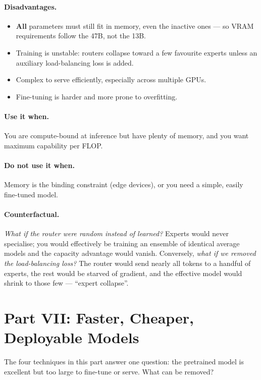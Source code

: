 \documentclass[11pt,a4paper]{article}
\begin{document}
\paragraph{Disadvantages.}
\begin{itemize}
\item \textbf{All} parameters must still fit in memory, even the inactive ones --- so VRAM
  requirements follow the 47B, not the 13B.
\item Training is unstable: routers collapse toward a few favourite experts unless an
  auxiliary load-balancing loss is added.
\item Complex to serve efficiently, especially across multiple GPUs.
\item Fine-tuning is harder and more prone to overfitting.
\end{itemize}

\paragraph{Use it when.} You are compute-bound at inference but have plenty of memory, and you
want maximum capability per FLOP.
\paragraph{Do not use it when.} Memory is the binding constraint (edge devices), or you need a
simple, easily fine-tuned model.

\paragraph{Counterfactual.} \emph{What if the router were random instead of learned?} Experts
would never specialise; you would effectively be training an ensemble of identical average
models and the capacity advantage would vanish. Conversely, \emph{what if we removed the
load-balancing loss?} The router would send nearly all tokens to a handful of experts, the
rest would be starved of gradient, and the effective model would shrink to those few ---
``expert collapse''.

\section{Part VII: Faster, Cheaper, Deployable Models}

The four techniques in this part answer one question: the pretrained model is excellent but
too large to fine-tune or serve. What can be removed?
\end{document}
